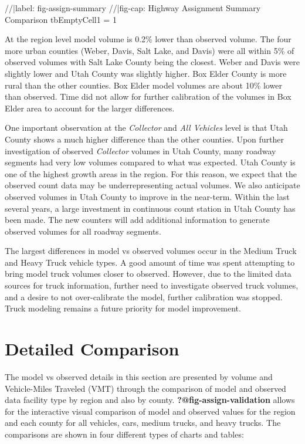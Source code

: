 \documentclass[
  letterpaper,
  DIV=11,
  numbers=noendperiod]{scrreprt}
\newenvironment{Shaded}{\begin{snugshade}}{\end{snugshade}}
\newcommand{\NormalTok}[1]{\textcolor[rgb]{0.00,0.23,0.31}{#1}}
\begin{document}
\begin{Shaded}
\begin{Highlighting}[]
\NormalTok{//|label: fig{-}assign{-}summary}
\NormalTok{//|fig{-}cap: Highway Assignment Summary Comparison}
\NormalTok{tbEmptyCell1 = 1}
\end{Highlighting}
\end{Shaded}

At the region level model volume is 0.2\% lower than observed volume.
The four more urban counties (Weber, Davis, Salt Lake, and Davis) were
all within 5\% of observed volumes with Salt Lake County being the
closest. Weber and Davis were slightly lower and Utah County was
slightly higher. Box Elder County is more rural than the other counties.
Box Elder model volumes are about 10\% lower than observed. Time did not
allow for further calibration of the volumes in Box Elder area to
account for the larger differences.

One important observation at the \emph{Collector} and \emph{All
Vehicles} level is that Utah County shows a much higher difference than
the other counties. Upon further investigation of observed
\emph{Collector} volumes in Utah County, many roadway segments had very
low volumes compared to what was expected. Utah County is one of the
highest growth areas in the region. For this reason, we expect that the
observed count data may be underrepresenting actual volumes. We also
anticipate observed volumes in Utah County to improve in the near-term.
Within the last several years, a large investment in continuous count
station in Utah County has been made. The new counters will add
additional information to generate observed volumes for all roadway
segments.

The largest differences in model vs observed volumes occur in the Medium
Truck and Heavy Truck vehicle types. A good amount of time was spent
attempting to bring model truck volumes closer to observed. However, due
to the limited data sources for truck information, further need to
investigate observed truck volumes, and a desire to not over-calibrate
the model, further calibration was stopped. Truck modeling remains a
future priority for model improvement.

\hypertarget{detailed-comparison}{%
\section{Detailed Comparison}\label{detailed-comparison}}

The model vs observed details in this section are presented by volume
and Vehicle-Miles Traveled (VMT) through the comparison of model and
observed data facility type by region and also by county.
\textbf{?@fig-assign-validation} allows for the interactive visual
comparison of model and observed values for the region and each county
for all vehicles, cars, medium trucks, and heavy trucks. The comparisons
are shown in four different types of charts and tables:
\end{document}
